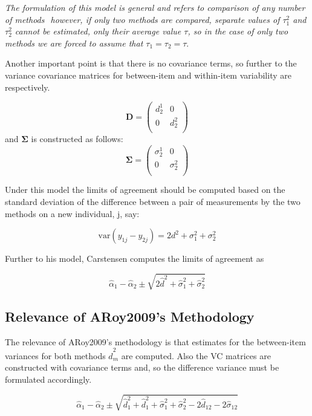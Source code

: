 \documentclass[12pt, a4paper]{report}
\theoremstyle{plain}
\theoremstyle{definition}
\theoremstyle{remark}
\begin{document}
	\emph{The formulation of this model is general and refers to comparison
		of any number of methods  however, if only two methods are
		compared, separate values of $\tau^2_1$ and $\tau^2_2$ cannot be
		estimated, only their average value $\tau$, so in the case of only
		two methods we are forced to assume that $\tau_1 = \tau_2 = \tau$}\citep{BXC2008}.
	
	Another important point is that there is no covariance terms, so
	further to  \citet{BXC2008} the variance covariance matrices for
	between-item and within-item variability are respectively.
	
	\[\boldsymbol{D} = \left(
	\begin{array}{cc}
	d^1_2  & 0 \\
	0 & d^2_2 \\
	\end{array}
	\right) \]
	and  $\boldsymbol{\Sigma}$ is constructed as follows:
	\[\boldsymbol{\Sigma} = \left(
	\begin{array}{cc}
	\sigma^1_2  & 0 \\
	0 & \sigma^2_2 \\
	\end{array}
	\right) \]
	
	
	Under this model the limits of agreement should be computed based
	on the standard deviation of the difference between a pair of
	measurements by the two methods on a new individual, j, say:
	
	\[ \mbox{var}(y_{1j} - y_{2j}) = 2d^2 + \sigma^2_1 + \sigma^2_2  \]
	
	Further to his model, Carstensen computes the limits of agreement
	as
	
	\[
	\hat{\alpha}_1 - \hat{\alpha}_2 \pm \sqrt{2 \hat{d}^2 + 	\hat{\sigma}^2_1 + \hat{\sigma}^2_2}
	\]
	
	
	\subsection{Relevance of ARoy2009's Methodology}
	
	The relevance of ARoy2009's methodology is that estimates for the between-item variances for both methods $\hat{d}^2_m$ are computed. Also the VC matrices are constructed with covariance
	terms and, so the difference variance must be formulated accordingly.
	
	
	\[
	\hat{\alpha}_1 - \hat{\alpha}_2 \pm \sqrt{ \hat{d}^2_1  +
		\hat{d}^2_1 + \hat{\sigma}^2_1 + \hat{\sigma}^2_2 - 2 \hat{d}_{12}
		- 2 \hat{\sigma}_12}
	\]
	
\end{document}
